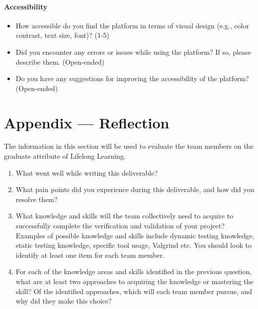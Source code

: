 \documentclass[12pt, titlepage]{article}
\begin{document}
\paragraph{Accessibility}
\begin{itemize}
  \item{How accessible do you find the platform in terms of visual design (e.g., color contrast, text size, font)? (1-5)}
  \item{Did you encounter any errors or issues while using the platform? If so, please describe them. (Open-ended)}
  \item{Do you have any suggestions for improving the accessibility of the platform?
        (Open-ended)}
\end{itemize}

\newpage{}
\section*{Appendix --- Reflection}


The information in this section will be used to evaluate the team members on the
graduate attribute of Lifelong Learning.



\begin{enumerate}
  \item What went well while writing this deliverable?
  \item What pain points did you experience during this deliverable, and how
        did you resolve them?
  \item What knowledge and skills will the team collectively need to acquire to
        successfully complete the verification and validation of your project?
        Examples of possible knowledge and skills include dynamic testing knowledge,
        static testing knowledge, specific tool usage, Valgrind etc.  You should look to
        identify at least one item for each team member.
  \item For each of the knowledge areas and skills identified in the previous
        question, what are at least two approaches to acquiring the knowledge or
        mastering the skill?  Of the identified approaches, which will each team
        member pursue, and why did they make this choice?
\end{enumerate}
\end{document}
